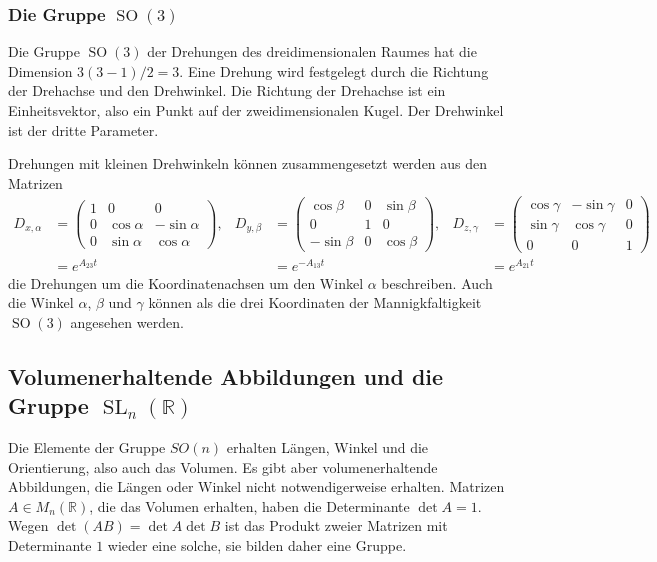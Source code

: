 \subsubsection{Die Gruppe $\operatorname{SO}(3)$}
Die Gruppe $\operatorname{SO}(3)$ der Drehungen des dreidimensionalen
Raumes hat die Dimension $3(3-1)/2=3$.
Eine Drehung wird festgelegt durch die Richtung der Drehachse und den
Drehwinkel.
Die Richtung der Drehachse ist ein Einheitsvektor, also ein Punkt
auf der zweidimensionalen Kugel.
Der Drehwinkel ist der dritte Parameter.

Drehungen mit kleinen Drehwinkeln können zusammengesetzt werden
aus den Matrizen
\begin{align*}
D_{x,\alpha}
&=
\begin{pmatrix}
1&0&0\\
0&\cos\alpha&-\sin\alpha\\
0&\sin\alpha& \cos\alpha
\end{pmatrix},
&
D_{y,\beta}
&=
\begin{pmatrix}
 \cos\beta&0&\sin\beta\\
      0    &1&     0    \\
-\sin\beta&0&\cos\beta
\end{pmatrix},
&
D_{z,\gamma}
&=
\begin{pmatrix}
\cos\gamma&-\sin\gamma&0\\
\sin\gamma& \cos\gamma&0\\
    0     &     0     &1
\end{pmatrix}
\\
&=
e^{A_{23}t}
&
&=
e^{-A_{13}t}
&
&=
e^{A_{21}t}
\end{align*}
die Drehungen um die Koordinatenachsen um den Winkel $\alpha$
beschreiben.
Auch die Winkel $\alpha$, $\beta$ und $\gamma$ können als die
drei Koordinaten der Mannigkfaltigkeit $\operatorname{SO}(3)$
angesehen werden.

%
%
\subsection{Volumenerhaltende Abbildungen und
die Gruppe $\operatorname{SL}_n(\mathbb{R})$
\label{buch:gruppen:sl}}
Die Elemente der Gruppe $SO(n)$ erhalten Längen, Winkel und die
Orientierung, also auch das Volumen.
Es gibt aber volumenerhaltende Abbildungen, die Längen oder Winkel
nicht notwendigerweise erhalten.
Matrizen $A\in M_n(\mathbb{R})$, die das Volumen erhalten,
haben die Determinante $\det A=1$.
Wegen $\det(AB)=\det A\det B$ ist das Produkt zweier Matrizen mit
Determinante $1$ wieder eine solche, sie bilden daher eine Gruppe.

